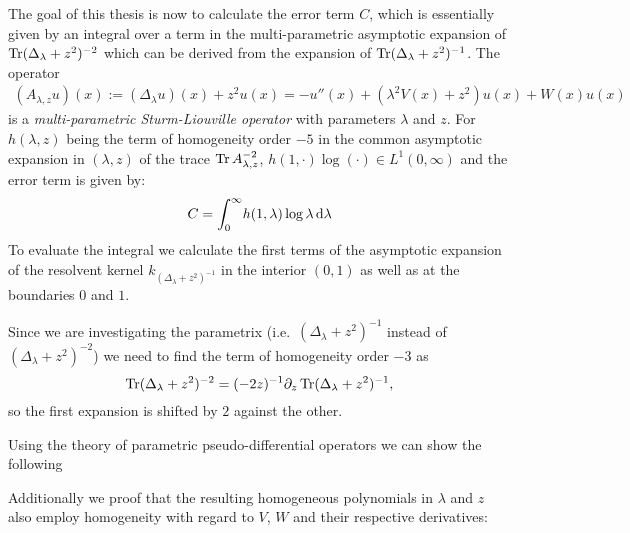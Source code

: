 The goal of this thesis is now to calculate the error term $C$, which is
essentially given by an integral over a term in the multi-parametric asymptotic
expansion of $\Tr(\Delta_\lambda + z^2)^{-2}$ which can be derived from the
expansion of $\Tr(\Delta_\lambda + z^2)^{-1}$. The operator
\begin{align*}
  (A_{\lambda,z}u)(x) := (\Delta_\lambda u)(x) + z^2 u(x)
           = -u''(x) + (\lambda^2 V(x) + z^2) u(x) + W(x) u(x)
\end{align*}
is a \emph{multi-parametric Sturm-Liouville operator} with parameters $\lambda$
and $z$. For $h(\lambda,z)$ being the term of homogeneity order $-5$ in the
common asymptotic expansion in $(\lambda,z)$ of the trace $\Tr
A_{\lambda,z}^{-2}$, $h(1,\cdot)\log(\cdot)\in L^1(0,\infty)$ and the error term
is given by:
\begin{align*}
  C = \Integ[\infty]{0}{\lambda}{h(1,\lambda)\log\lambda}
\end{align*}
To evaluate the integral we calculate the first terms of the asymptotic
expansion of the resolvent kernel $k_{(\Delta_\lambda + z^2)^{-1}}$ in the
interior $(0,1)$ as well as at the boundaries $0$ and $1$.

Since we are investigating the parametrix (i.e.\ $(\Delta_\lambda + z^2)^{-1}$
instead of $(\Delta_\lambda + z^2)^{-2}$) we need to find the term of
homogeneity order $-3$ as
\begin{equation*}
  \Tr(\Delta_\lambda + z^2)^{-2} = (-2z)^{-1}\partial_z\Tr(\Delta_\lambda +
  z^2)^{-1},
\end{equation*}
so the first expansion is shifted by $2$ against the other.

Using the theory of parametric pseudo-differential operators we can show the
following
\begin{MainTheoremIntro}
  
\end{MainTheoremIntro}
Additionally we proof that the resulting homogeneous polynomials in $\lambda$
and $z$ also employ homogeneity with regard to $V$, $W$ and their respective
derivatives:
\begin{MainTheoremIntro}
  
\end{MainTheoremIntro}

